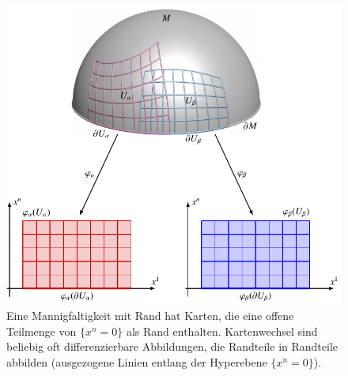 %
%
%
\begin{figure}
\centering
\includegraphics{chapters/040-green/images/randkarten.pdf}
\caption{Eine Mannigfaltigkeit mit Rand hat Karten, die eine offene
Teilmenge von $\{x^n=0\}$ als Rand enthalten.
Kartenwechsel sind beliebig oft differenzierbare Abbildungen, die
Randteile in Randteile abbilden (ausgezogene Linien entlang der
Hyperebene $\{x^n=0\}$).
\label{buch:green:green:fig:randkarten}}
\end{figure}
